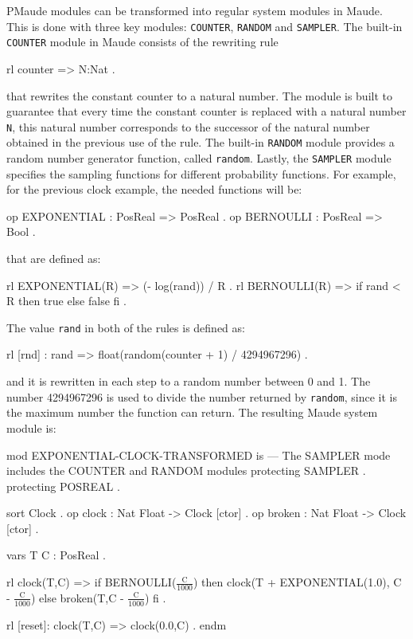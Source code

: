 PMaude modules can be transformed into regular system modules in Maude. This is done with three key modules: \texttt{COUNTER}, \texttt{RANDOM} and \texttt{SAMPLER}. The built-in \texttt{COUNTER} module in Maude consists of the rewriting rule
\\
\begin{maude}
rl counter => N:Nat .
\end{maude}
that rewrites the constant counter to a natural number. The module is built to guarantee that every time the constant counter is replaced with a natural number \texttt{N}, this natural number corresponds to the successor of the natural number obtained in the previous use of the rule. The built-in \texttt{RANDOM} module provides a random number generator function, called \texttt{random}. Lastly, the \texttt{SAMPLER} module specifies the sampling functions for different probability functions. For example, for the previous clock example, the needed functions will be:
\\
\begin{maude}
op EXPONENTIAL : PosReal => PosReal .
op BERNOULLI : PosReal => Bool .
\end{maude}
that are defined as:
\\
\begin{maude}
rl EXPONENTIAL(R) => (- log(rand)) / R .
rl BERNOULLI(R) => if rand < R then true else false fi .
\end{maude}
The value \texttt{rand} in both of the rules is defined as:
\\
\begin{maude}
rl [rnd] : rand => float(random(counter + 1) / 4294967296) .
\end{maude}
and it is rewritten in each step to a random number between 0 and 1. The number 4294967296 is used to divide the number returned by \texttt{random}, since it is the maximum number the function can return. The resulting Maude system module \cite{Agha2006} is:
\\
\begin{maude}
mod EXPONENTIAL-CLOCK-TRANSFORMED is 
  --- The SAMPLER mode includes the COUNTER and RANDOM modules
  protecting SAMPLER .
  protecting POSREAL .
  
  sort Clock . 
  op clock : Nat Float -> Clock [ctor] . 
  op broken : Nat Float -> Clock [ctor] . 
  
  vars T C : PosReal . 
  
  rl clock(T,C) => if BERNOULLI($\frac{\text{C}}{1000}$) then 
                        clock(T + EXPONENTIAL(1.0), C - $\frac{\text{C}}{1000}$) 
                   else 
                        broken(T,C - $\frac{\text{C}}{1000}$)
                   fi .
  
  rl [reset]: clock(T,C) => clock(0.0,C) .
endm
\end{maude}

